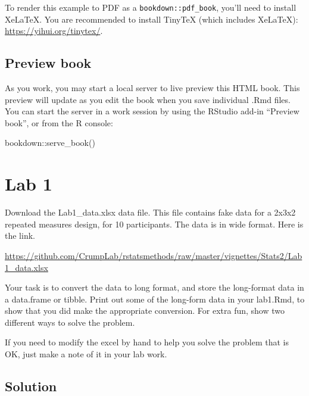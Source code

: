 \documentclass[
]{book}
\newenvironment{Shaded}{\begin{snugshade}}{\end{snugshade}}
\newcommand{\FunctionTok}[1]{\textcolor[rgb]{0.00,0.00,0.00}{#1}}
\newcommand{\NormalTok}[1]{#1}
\newcommand{\SpecialCharTok}[1]{\textcolor[rgb]{0.00,0.00,0.00}{#1}}
\theoremstyle{definition}
\theoremstyle{definition}
\theoremstyle{definition}
\theoremstyle{definition}
\theoremstyle{remark}
\begin{document}
To render this example to PDF as a \texttt{bookdown::pdf\_book}, you'll need to install XeLaTeX. You are recommended to install TinyTeX (which includes XeLaTeX): \url{https://yihui.org/tinytex/}.

\hypertarget{preview-book}{%
\section{Preview book}\label{preview-book}}

As you work, you may start a local server to live preview this HTML book. This preview will update as you edit the book when you save individual .Rmd files. You can start the server in a work session by using the RStudio add-in ``Preview book'', or from the R console:

\begin{Shaded}
\begin{Highlighting}[]
\NormalTok{bookdown}\SpecialCharTok{::}\FunctionTok{serve\_book}\NormalTok{()}
\end{Highlighting}
\end{Shaded}

\hypertarget{lab-1}{%
\chapter{Lab 1}\label{lab-1}}

Download the Lab1\_data.xlsx data file. This file contains fake data for a 2x3x2 repeated measures design, for 10 participants. The data is in wide format. Here is the link.

\url{https://github.com/CrumpLab/rstatsmethods/raw/master/vignettes/Stats2/Lab1_data.xlsx}

Your task is to convert the data to long format, and store the long-format data in a data.frame or tibble. Print out some of the long-form data in your lab1.Rmd, to show that you did make the appropriate conversion. For extra fun, show two different ways to solve the problem.

If you need to modify the excel by hand to help you solve the problem that is OK, just make a note of it in your lab work.

\hypertarget{solution}{%
\section{Solution}\label{solution}}
\end{document}
